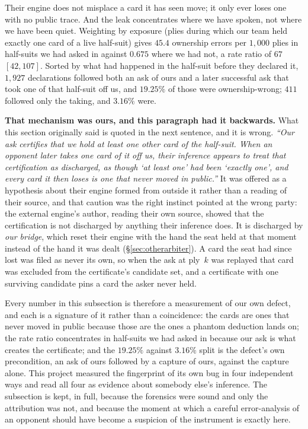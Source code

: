 \documentclass[11pt,letterpaper]{article}
\begin{document}
\noindent Their engine does not misplace a card it has seen move; it only ever
loses one with no public trace. And the leak concentrates where we have
spoken, not where we have been quiet. Weighting by exposure (plies during
which our team held exactly one card of a live half-suit) gives $45.4$
ownership errors per $1{,}000$ plies in half-suits we had asked in against
$0.675$ where we had not, a rate ratio of $67$ $[42, 107]$. Sorted by what had
happened in the half-suit before they declared it, $1{,}927$ declarations
followed both an ask of ours and a later successful ask that took one of that
half-suit off us, and $19.25\%$ of those were ownership-wrong; $411$ followed
only the taking, and $3.16\%$ were.

\textbf{That mechanism was ours, and this paragraph had it backwards.} What
this section originally said is quoted in the next sentence, and it is wrong.
\emph{``Our ask certifies that we hold at least one other card of the
half-suit. When an opponent later takes one card of it off us, their inference
appears to treat that certification as discharged, as though `at least one' had
been `exactly one', and every card it then loses is one that never moved in
public.''} It was offered as a hypothesis about their engine formed from
outside it rather than a reading of their source, and that caution was the
right instinct pointed at the wrong party: the external engine's author,
reading their own source, showed that the certification is not discharged by
anything their inference does. It is discharged by \emph{our bridge}, which reset their engine with the
hand the seat held at that moment instead of the hand it was dealt
(\S\ref{sec:otherarbiter}). A card the seat had since lost was filed as never
its own, so when the ask at ply~$k$ was replayed that card was excluded from
the certificate's candidate set, and a certificate with one surviving candidate
pins a card the asker never held.

Every number in this subsection is therefore a measurement of our own defect,
and each is a signature of it rather than a coincidence: the cards are ones
that never moved in public because those are the ones a phantom deduction lands
on; the rate ratio concentrates in half-suits we had asked in because our ask
is what creates the certificate; and the $19.25\%$ against $3.16\%$ split is
the defect's own precondition, an ask of ours followed by a capture of ours,
against the capture alone. This project measured the fingerprint of its own bug
in four independent ways and read all four as evidence about somebody else's
inference. The subsection is kept, in full, because the forensics were sound
and only the attribution was not, and because the moment at which a careful
error-analysis of an opponent should have become a suspicion of the instrument
is exactly here.
\end{document}
